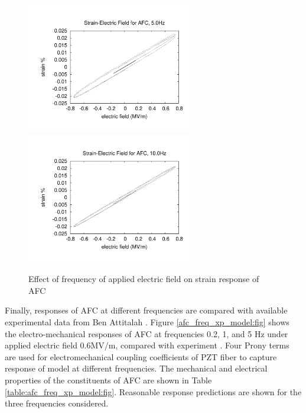\begin{figure}
{\includegraphics[width=2.9in]{./chap_4_structural_analyses/afc_unit_cell/frequency_effect/electric_field_vs_strains_freq_5p0}}
{\includegraphics[width=2.9in]{./chap_4_structural_analyses/afc_unit_cell/frequency_effect/electric_field_vs_strains_freq_10p0}}
\caption{Effect of frequency of applied electric field on strain response of AFC}
\label{fig:afc_Frequency_Effect}
\end{figure}






Finally, responses of AFC at different frequencies are compared with available experimental data from Ben Attitalah \cite{atillah2014}. Figure \ref{afc_freq_xp_model:fig} shows the electro-mechanical responses of AFC at frequencies 0.2, 1, and 5 Hz under  applied electric field 0.6MV/m, compared with experiment \cite{atillah2014}. Four Prony terms are used for electromechanical coupling coefficients of PZT fiber to capture response of model at different frequencies. 
The mechanical and electrical properties of the constituents of AFC are shown in Table \ref{table:afc_freq_xp_model:fig}. Reasonable response predictions are shown for the three frequencies considered. 



